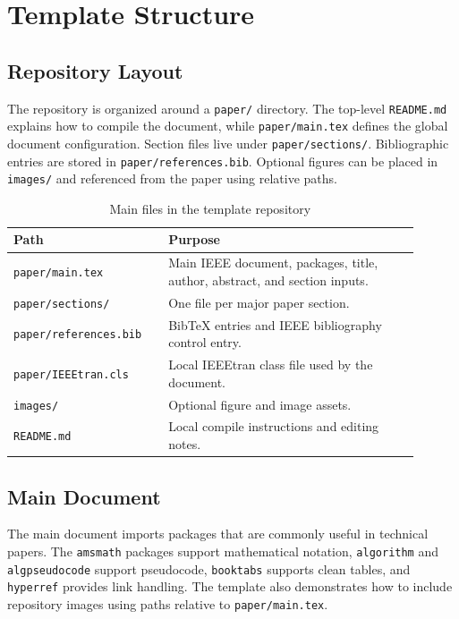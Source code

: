 \section{Template Structure}

\subsection{Repository Layout}

The repository is organized around a \texttt{paper/} directory. The top-level \texttt{README.md} explains how to compile the document, while \texttt{paper/main.tex} defines the global document configuration. Section files live under \texttt{paper/sections/}. Bibliographic entries are stored in \texttt{paper/references.bib}. Optional figures can be placed in \texttt{images/} and referenced from the paper using relative paths.

\begin{table}[H]
\centering
\caption{Main files in the template repository}
\label{tab:layout}
\begin{tabular}{p{0.34\linewidth}p{0.56\linewidth}}
\toprule
\textbf{Path} & \textbf{Purpose} \\
\midrule
\texttt{paper/main.tex} & Main IEEE document, packages, title, author, abstract, and section inputs. \\
\texttt{paper/sections/} & One file per major paper section. \\
\texttt{paper/references.bib} & BibTeX entries and IEEE bibliography control entry. \\
\texttt{paper/IEEEtran.cls} & Local IEEEtran class file used by the document. \\
\texttt{images/} & Optional figure and image assets. \\
\texttt{README.md} & Local compile instructions and editing notes. \\
\bottomrule
\end{tabular}
\end{table}

\subsection{Main Document}

The main document imports packages that are commonly useful in technical papers. The \texttt{amsmath} packages support mathematical notation, \texttt{algorithm} and \texttt{algpseudocode} support pseudocode, \texttt{booktabs} supports clean tables, and \texttt{hyperref} provides link handling. The template also demonstrates how to include repository images using paths relative to \texttt{paper/main.tex}.

